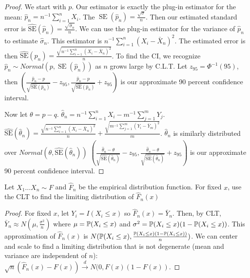 \documentclass[10pt]{article}
\begin{document}
\begin{proof}
    We start with $p$. Our estimator is exactly the plug-in estimator for the
    mean: $\hat{p}_n = n^{-1}\sum_{i=1}^n X_i$. The
    $\operatorname{SE}({\hat{p}_n}) = \frac{\sqrt{\sigma}}{n}$. Then our
    estimated standard error is $\operatorname{\hat{SE}}({\hat{p}_n}) =
    \frac{\sqrt{\hat{\sigma}_n}}{n}$. We can use the plug-in estimator for the
    variance of $\hat{p}_n$ to estimate $\hat{\sigma}_n$. This estimator is $n^{-1}\sum_{i=1}^n (X_i - \bar{X}_n)^2$. The estimated error is then $\operatorname{\hat{SE}}({\hat{p}_n}) = \frac{\sqrt{n^{-1}\sum_{i=1}^n (X_i - \bar{X}_n)^2}}{n}$. To find the CI, we recognize $\hat{p}_n \sim Normal(p, \operatorname{SE}({\hat{p}_n}))$
    as $n$ grows large by C.L.T. Let $z_{95} = \Phi^{-1}(95)$, then
    $(\frac{\hat{p}_n - p}{\sqrt{\operatorname{\hat{SE}}({\hat{p}_n})}} - z_{95},
    \frac{\hat{p}_n - p}{\sqrt{\operatorname{\hat{SE}}({\hat{p}_n})}} + z_{95})$ is
    our approximate 90 percent confidence interval.

    Now let $\theta = p - q$. $\hat{\theta}_n = n^{-1}\sum_{i=1}^n X_i -
    m^{-1}\sum_{j=1}^m Y_j$. $\operatorname{\hat{SE}}({\hat{\theta}_n}) =
    \frac{\sqrt{n^{-1}\sum_{i=1}^n (X_i - \bar{X}_n)^2}}{n} +
    \frac{\sqrt{m^{-1}\sum_{j=1}^m (Y_i - \bar{Y}_m)^2}}{m}$. $\hat{\theta}_n$
    is similarly distributed over $Normal(\theta,
    \operatorname{\hat{SE}}(\hat{\theta}_n))$
    $(\frac{\hat{\theta}_n - \theta}{\sqrt{\operatorname{\hat{SE}}({\hat{\theta}_n})}} - z_{95},
    \frac{\hat{\theta}_n - \theta}{\sqrt{\operatorname{\hat{SE}}({\hat{\theta}_n})}} + z_{95})$ is
    our approximate 90 percent confidence interval.
\end{proof}

\begin{exercise}
    Let $X_1 \dots X_n \sim F$ and $\hat{F}_n$ be the empirical distribution
    function. For fixed $x$, use the CLT to find the limiting distribution
    of $\hat{F}_n(x)$
\end{exercise}

\begin{proof}
    For fixed $x$, let $Y_i = I(X_i \leq x)$ so $\hat{F}_n(x) = \bar{Y}_n$.
    Then, by CLT, $\bar{Y}_n \approx N(\mu, \frac{\sigma^2}{n})$ where $\mu
    = \P(X_i \leq x)$ and $\sigma^2 = \P(X_i \leq x)(1 - \P(X_i \leq
    x))$. This approximation of $\hat{F}_n(x)$ is
    $N(\P(X_i \leq x),\frac{\P(X_i \leq x)(1 - \P(X_i \leq x))}{n})$. We can
    center and scale to find a limiting distribution that is not degenerate
    (mean and variance are independent of $n$): $\sqrt{n}(\hat{F}_n(x) -
    F(x)) \xrightarrow{d}{} N(0, F(x)(1 - F(x))$.
\end{proof}
\end{document}
